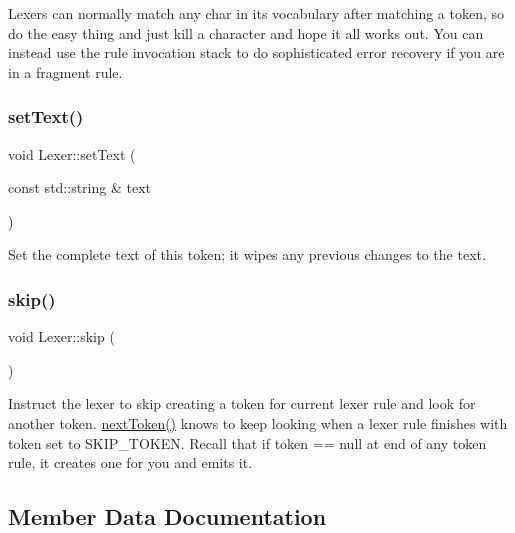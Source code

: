 Lexers can normally match any char in it\textquotesingle{}s vocabulary after matching a token, so do the easy thing and just kill a character and hope it all works out. You can instead use the rule invocation stack to do sophisticated error recovery if you are in a fragment rule. \mbox{\label{classantlr4_1_1Lexer_a574e80225f28d8a8005afbe370da9028}} 
\subsubsection{\texorpdfstring{set\+Text()}{setText()}}
{\footnotesize\ttfamily void Lexer\+::set\+Text (\begin{DoxyParamCaption}\item[{const std\+::string \&}]{text }\end{DoxyParamCaption})\hspace{0.3cm}{\ttfamily [virtual]}}

Set the complete text of this token; it wipes any previous changes to the text. \mbox{\label{classantlr4_1_1Lexer_a8d2585d70adce01584a505a25c3e179d}} 
\subsubsection{\texorpdfstring{skip()}{skip()}}
{\footnotesize\ttfamily void Lexer\+::skip (\begin{DoxyParamCaption}{ }\end{DoxyParamCaption})\hspace{0.3cm}{\ttfamily [virtual]}}

Instruct the lexer to skip creating a token for current lexer rule and look for another token. \hyperlink{classantlr4_1_1Lexer_a50ac15500fabb9c3fee8d23af11fdc02}{next\+Token()} knows to keep looking when a lexer rule finishes with token set to S\+K\+I\+P\+\_\+\+T\+O\+K\+EN. Recall that if token == null at end of any token rule, it creates one for you and emits it. 

\subsection{Member Data Documentation}
\mbox{\label{classantlr4_1_1Lexer_a3a52d82944ab71f4b5cbeb785fc8471a}} 
